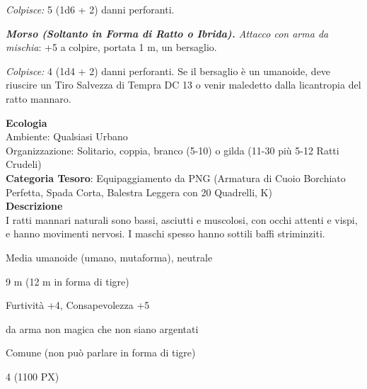 \begin{multicols}{2}
{\emph{Colpisce:} 5 (1d6 + 2) danni perforanti.

\emph{\textbf{Morso (Soltanto in Forma di Ratto o Ibrida).} Attacco con arma da mischia}: +5 a colpire, portata 1 m, un bersaglio.

\emph{Colpisce:} 4 (1d4 + 2) danni perforanti. Se il bersaglio è un umanoide, deve riuscire un Tiro Salvezza di Tempra DC 13 o venir maledetto dalla licantropia del ratto mannaro.

\textbf{Ecologia}\\
Ambiente: Qualsiasi Urbano\\
Organizzazione: Solitario, coppia, branco (5-10) o gilda (11-30 più 5-12 Ratti Crudeli)\\
\textbf{Categoria Tesoro}: Equipaggiamento da PNG (Armatura di Cuoio Borchiato Perfetta, Spada Corta, Balestra Leggera con 20 Quadrelli, K)\\
\textbf{Descrizione}\\
I ratti mannari naturali sono bassi, asciutti e muscolosi, con occhi attenti e vispi, e hanno movimenti nervosi. I maschi spesso hanno sottili baffi striminziti.

\begin{description}[noitemsep, topsep=0pt, parsep=0pt, partopsep=0pt, itemsep=1pt, leftmargin=2.35cm,  labelwidth=2.2cm, itemindent=0cm, listparindent=0pt] %
\setlength{\baselineskip}{10pt}
\item[\textbf{Taglia/Tipo}] Media umanoide (umano, mutaforma), neutrale
\item[\textbf{Caratt.}] 
\item[\textbf{Punti Ferita}] 
\item[\textbf{Movimento}] 9 m (12 m in forma di tigre)
\item[\textbf{Tiri Salvez.}] 
\item[\textbf{Comp.}] Furtività +4, Consapevolezza +5
\item[\textbf{Imm. Danni}] da arma non magica che non siano argentati
\item[\textbf{Sensi}] 
\item[\textbf{Linguaggi}] Comune (non può parlare in forma di tigre)
\item[\textbf{Sfida}] 4 (1100 PX)
\end{description}
\smallskip

}
\end{multicols}
